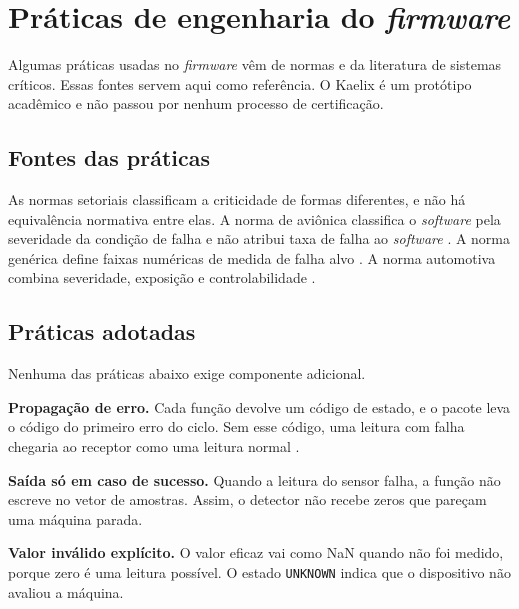 
\chapter{Práticas de engenharia do \emph{firmware}}
\label{ape:praticas}

Algumas práticas usadas no \emph{firmware} vêm de normas e da literatura de sistemas críticos.
Essas fontes servem aqui como referência. O Kaelix é um protótipo acadêmico e não passou por
nenhum processo de certificação.

\section{Fontes das práticas}
\label{sec:ape-escalas}

As normas setoriais classificam a criticidade de formas diferentes, e não há equivalência
normativa entre elas. A norma de aviônica classifica o \emph{software} pela severidade da
condição de falha e não atribui taxa de falha ao \emph{software} \cite{do178c}. A norma
genérica define faixas numéricas de medida de falha alvo \cite{iec61508}. A norma automotiva
combina severidade, exposição e controlabilidade \cite{iso26262}.

\section{Práticas adotadas}
\label{sec:ape-mecanismos}

Nenhuma das práticas abaixo exige componente adicional.

\textbf{Propagação de erro.} Cada função devolve um código de estado, e o pacote leva o código do
primeiro erro do ciclo. Sem esse código, uma leitura com falha chegaria ao receptor como uma leitura
normal \cite{esa1996,knight1986}.

\textbf{Saída só em caso de sucesso.} Quando a leitura do sensor falha, a função não escreve no
vetor de amostras. Assim, o detector não recebe zeros que pareçam uma máquina parada.

\textbf{Valor inválido explícito.} O valor eficaz vai como NaN quando não foi medido, porque zero
é uma leitura possível. O estado \texttt{UNKNOWN} indica que o dispositivo não avaliou a máquina.

